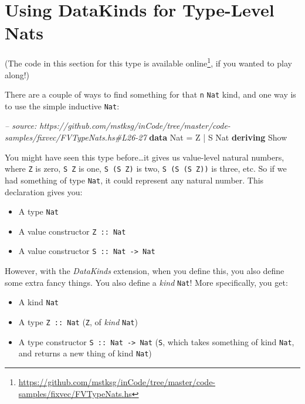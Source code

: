 \documentclass[]{article}
\newenvironment{Shaded}{\begin{snugshade}}{\end{snugshade}}
\newcommand{\CommentTok}[1]{\textcolor[rgb]{0.56,0.35,0.01}{\textit{#1}}}
\newcommand{\DataTypeTok}[1]{\textcolor[rgb]{0.13,0.29,0.53}{#1}}
\newcommand{\FunctionTok}[1]{\textcolor[rgb]{0.00,0.00,0.00}{#1}}
\newcommand{\KeywordTok}[1]{\textcolor[rgb]{0.13,0.29,0.53}{\textbf{#1}}}
\renewcommand{\href}[2]{#2\footnote{\url{#1}}}
\begin{document}
\hypertarget{using-datakinds-for-type-level-nats}{%
\section{Using DataKinds for Type-Level
Nats}\label{using-datakinds-for-type-level-nats}}

(The code in this section for this type is
\href{https://github.com/mstksg/inCode/tree/master/code-samples/fixvec/FVTypeNats.hs}{available
online}, if you wanted to play along!)

There are a couple of ways to find something for that \texttt{n} \texttt{Nat}
kind, and one way is to use the simple inductive \texttt{Nat}:

\begin{Shaded}
\begin{Highlighting}[]
\CommentTok{-- source: https://github.com/mstksg/inCode/tree/master/code-samples/fixvec/FVTypeNats.hs#L26-27}
\KeywordTok{data} \DataTypeTok{Nat} \FunctionTok{=} \DataTypeTok{Z} \FunctionTok{|} \DataTypeTok{S} \DataTypeTok{Nat}
         \KeywordTok{deriving} \DataTypeTok{Show}
\end{Highlighting}
\end{Shaded}

You might have seen this type before\ldots{}it gives us value-level natural
numbers, where \texttt{Z} is zero, \texttt{S\ Z} is one, \texttt{S\ (S\ Z)} is
two, \texttt{S\ (S\ (S\ Z))} is three, etc. So if we had something of type
\texttt{Nat}, it could represent any natural number. This declaration gives you:

\begin{itemize}
\tightlist
\item
  A type \texttt{Nat}
\item
  A value constructor \texttt{Z\ ::\ Nat}
\item
  A value constructor \texttt{S\ ::\ Nat\ -\textgreater{}\ Nat}
\end{itemize}

However, with the \emph{DataKinds} extension, when you define this, you also
define some extra fancy things. You also define a \emph{kind} \texttt{Nat}! More
specifically, you get:

\begin{itemize}
\tightlist
\item
  A kind \texttt{Nat}
\item
  A type \texttt{Z\ ::\ Nat} (\texttt{Z}, of \emph{kind} \texttt{Nat})
\item
  A type constructor \texttt{S\ ::\ Nat\ -\textgreater{}\ Nat} (\texttt{S},
  which takes something of kind \texttt{Nat}, and returns a new thing of kind
  \texttt{Nat})
\end{itemize}
\end{document}
